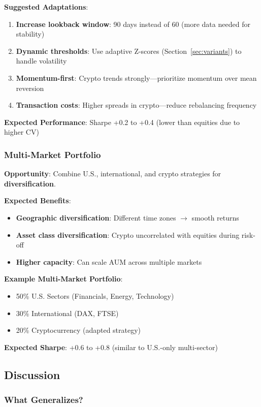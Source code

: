 \textbf{Suggested Adaptations}:
\begin{enumerate}
\item \textbf{Increase lookback window}: 90 days instead of 60 (more data needed for stability)
\item \textbf{Dynamic thresholds}: Use adaptive Z-scores (Section~\ref{sec:variants}) to handle volatility
\item \textbf{Momentum-first}: Crypto trends strongly---prioritize momentum over mean reversion
\item \textbf{Transaction costs}: Higher spreads in crypto---reduce rebalancing frequency
\end{enumerate}

\textbf{Expected Performance}: Sharpe +0.2 to +0.4 (lower than equities due to higher CV)

\subsubsection{Multi-Market Portfolio}

\textbf{Opportunity}: Combine U.S., international, and crypto strategies for \textbf{diversification}.

\textbf{Expected Benefits}:
\begin{itemize}
\item \textbf{Geographic diversification}: Different time zones $\rightarrow$ smooth returns
\item \textbf{Asset class diversification}: Crypto uncorrelated with equities during risk-off
\item \textbf{Higher capacity}: Can scale AUM across multiple markets
\end{itemize}

\textbf{Example Multi-Market Portfolio}:
\begin{itemize}
\item 50\% U.S. Sectors (Financials, Energy, Technology)
\item 30\% International (DAX, FTSE)
\item 20\% Cryptocurrency (adapted strategy)
\end{itemize}

\textbf{Expected Sharpe}: +0.6 to +0.8 (similar to U.S.-only multi-sector)

\subsection{Discussion}

\subsubsection{What Generalizes?}

